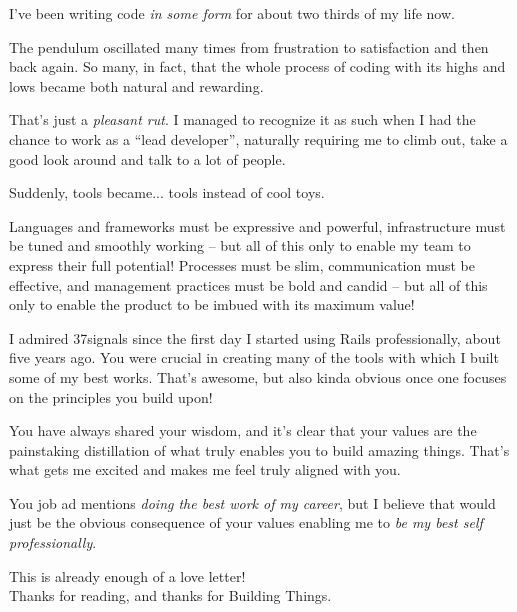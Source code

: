 \documentclass[
  fontsize=12pt,
  DIV=calc,
  parskip=half,
]{scrartcl}
\begin{document}
I've been writing code \emph{in some form} for about two thirds of my life now.

The pendulum oscillated many times from frustration to satisfaction and then back again. So many, in fact, that the whole process of coding with its highs and lows became both natural and rewarding.

That's just a \emph{pleasant rut}. I managed to recognize it as such when I had the chance to work as a ``lead developer'', naturally requiring me to climb out, take a good look around and talk to a lot of people.

Suddenly, tools became... tools instead of cool toys.

Languages and frameworks must be expressive and powerful, infrastructure must be tuned and smoothly working -- but all of this only to enable my team to express their full potential!
Processes must be slim, communication must be effective, and management practices must be bold and candid -- but all of this only to enable the product to be imbued with its maximum value!

I admired 37signals since the first day I started using Rails professionally, about five years ago.
You were crucial in creating many of the tools with which I built some of my best works.
That's awesome, but also kinda obvious once one focuses on the principles you build upon!

You have always shared your wisdom, and it's clear that your values are the painstaking distillation of what truly enables you to build amazing things.
That's what gets me excited and makes me feel truly aligned with you.

You job ad mentions \emph{doing the best work of my career}, but I believe that would just be the obvious consequence of your values enabling me to \emph{be my best self professionally}.

This is already enough of a love letter!\\
Thanks for reading, and thanks for Building Things.
\end{document}
